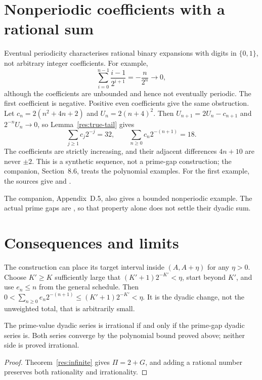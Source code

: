 \documentclass[11pt]{article}
\begin{document}
\section{Nonperiodic coefficients with a rational sum}\label{sec:carry}
Eventual periodicity characterises rational binary expansions with digits
in $\{0,1\}$, not arbitrary integer coefficients.  For example,
\[
 \sum_{i=0}^{n-1}\frac{i-1}{2^{i+1}}=-\frac{n}{2^n}\longrightarrow0,
\]
although the coefficients are unbounded and hence not eventually periodic.
The first coefficient is negative.  Positive even coefficients give the
same obstruction.  Let $c_n=2(n^2+4n+2)$ and
$U_n=2(n+4)^2$.  Then $U_{n+1}=2U_n-c_{n+1}$ and $2^{-n}U_n\to0$, so
Lemma~\ref{res:true-tail} gives
\[
 \sum_{j\ge1}c_j2^{-j}=32,
 \qquad \sum_{n\ge0}c_n2^{-(n+1)}=18.
\]
The coefficients are strictly increasing, and their adjacent differences
$4n+10$ are never $\pm2$.  This is a synthetic sequence, not a prime-gap
construction; the companion, Section~8.6, treats the polynomial examples.
For the first example, the sources give
and
.

The companion, Appendix~D.5, also gives a bounded nonperiodic example.
The actual prime gaps are
,
so that property alone does not settle their dyadic sum.

\section{Consequences and limits}\label{sec:open}
The construction can place its target interval inside $(A,A+\eta)$ for
any $\eta>0$.  Choose $K'\ge K$ sufficiently large that
$(K'+1)2^{-K'}<\eta$, start beyond $K'$, and use $e_n\le n$ from the
general schedule.  Then
$0<\sum_{n\ge0}e_n2^{-(n+1)}\le(K'+1)2^{-K'}<\eta$.
It is the dyadic change, not the unweighted total, that is arbitrarily small.

\begin{corollary}\label{res:irr-equivalence}
The prime-value dyadic series is irrational if and only if the prime-gap
dyadic series is. Both series converge by the polynomial bound proved above;
neither side is proved irrational.
\end{corollary}
\begin{proof}
Theorem~\ref{res:infinite} gives $\Pi=2+G$, and adding a rational number
preserves both rationality and irrationality.
\end{proof}
\end{document}
